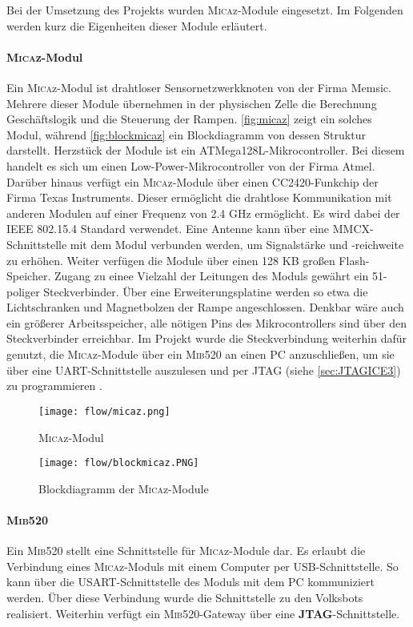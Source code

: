 Bei der Umsetzung des Projekts wurden \textsc{Mica}z-Module eingesetzt. Im Folgenden werden kurz die Eigenheiten dieser Module erläutert.

\paragraph{\textsc{Mica}z-Modul}
Ein \textsc{Mica}z-Modul ist drahtloser Sensornetzwerkknoten von der Firma Memsic. Mehrere dieser Module übernehmen in der physischen Zelle die Berechnung Geschäftslogik und die Steuerung der Rampen. \autoref{fig:micaz} zeigt ein solches Modul, während \autoref{fig:blockmicaz}  ein Blockdiagramm von dessen Struktur darstellt. Herzstück der Module ist ein ATMega128L-Mikrocontroller. Bei diesem handelt es sich um einen Low-Power-Mikrocontroller von der Firma Atmel. Darüber hinaus verfügt ein \textsc{Mica}z-Module über einen CC2420-Funkchip der Firma Texas Instruments. Dieser ermöglicht die drahtlose Kommunikation mit anderen Modulen auf einer Frequenz von 2.4 GHz ermöglicht. Es wird dabei der IEEE 802.15.4 Standard verwendet. Eine Antenne kann über eine MMCX-Schnittstelle mit dem Modul verbunden werden, um Signalstärke und -reichweite zu erhöhen. Weiter verfügen die Module über einen 128 KB großen Flash-Speicher.
Zugang zu einee Vielzahl der Leitungen des Moduls gewährt ein 51-poliger Steckverbinder. Über eine Erweiterungsplatine werden so etwa die Lichtschranken und Magnetbolzen der Rampe angeschlossen. Denkbar wäre auch ein größerer Arbeitsspeicher, alle nötigen Pins des Mikrocontrollers sind über den Steckverbinder erreichbar.
Im Projekt wurde die Steckverbindung weiterhin dafür genutzt, die \textsc{Mica}z-Module über ein \textsc{Mib}520 an einen PC anzuschließen, um sie über eine UART-Schnittstelle auszulesen und per JTAG (siehe \autoref{sec:JTAGICE3}) zu programmieren \cite{MICSHEET,C2420SHEET}.

\begin{figure}[th]
  \centering
    \texttt{[image: flow/micaz.png]}
    \caption{\textsc{Mica}z-Modul \cite{Memsic:2014:Online}}
    \label{fig:micaz}
\end{figure}

\begin{figure}[th]
  \centering
    \texttt{[image: flow/blockmicaz.PNG]}
    \caption{Blockdiagramm der \textsc{Mica}z-Module  \cite{Memsic:2014:Online}}
    \label{fig:blockmicaz}
\end{figure}

\paragraph{\textsc{Mib}520}
Ein \textsc{Mib}520 stellt eine Schnittstelle für \textsc{Mica}z-Module dar. Es erlaubt die Verbindung eines \textsc{Mica}z-Moduls mit einem Computer per USB-Schnittstelle. So kann über die USART-Schnittstelle des Moduls mit dem PC kommuniziert werden. Über diese Verbindung wurde die Schnittstelle zu den Volksbots realisiert. Weiterhin verfügt ein \textsc{Mib}520-Gateway über eine \textbf{JTAG}-Schnittstelle.
